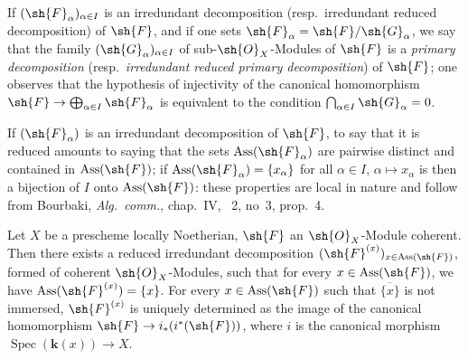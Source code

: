 If $(\sh{F}_\alpha)_{\alpha\in I}$ is an irredundant decomposition (resp.\ irredundant reduced decomposition) of $\sh{F}$, and if one sets $\sh{F}_\alpha=\sh{F}/\sh{G}_\alpha$, we say that the family $(\sh{G}_\alpha)_{\alpha\in I}$ of sub-$\sh{O}_X$-Modules of $\sh{F}$ is a \emph{primary decomposition} (resp.\ \emph{irredundant reduced primary decomposition}) of $\sh{F}$; one observes that the hypothesis of injectivity of the canonical homomorphism $\sh{F}\to\bigoplus_{\alpha\in I}\sh{F}_\alpha$ is equivalent to the condition $\bigcap_{\alpha\in I}\sh{G}_\alpha=0$.


If $(\sh{F}_\alpha)$ is an irredundant decomposition of $\sh{F}$, to say that it is reduced amounts to saying that the sets $\operatorname{Ass}(\sh{F}_\alpha)$ are pairwise distinct and contained in $\operatorname{Ass}(\sh{F})$; if $\operatorname{Ass}(\sh{F}_\alpha)=\{x_\alpha\}$ for all $\alpha\in I$, $\alpha\mapsto x_\alpha$ is then a bijection of $I$ onto $\operatorname{Ass}(\sh{F})$: these properties are local in nature and follow from Bourbaki, \emph{Alg.\ comm.}, chap.~IV, \textsection~2, no~3, prop.~4.

\begin{proposition}[3.2.6]
\label{IV.3.2.6}
Let $X$ be a prescheme locally Noetherian, $\sh{F}$ an $\sh{O}_X$-Module coherent.
Then there exists a reduced irredundant decomposition $(\sh{F}^{(x)})_{x\in\operatorname{Ass}(\sh{F})}$, formed of coherent $\sh{O}_X$-Modules, such that for every $x\in\operatorname{Ass}(\sh{F})$, we have $\operatorname{Ass}(\sh{F}^{(x)})=\{x\}$.
For every $x\in\operatorname{Ass}(\sh{F})$ such that $\overline{\{x\}}$ is not immersed, $\sh{F}^{(x)}$ is uniquely determined as the image of the canonical homomorphism $\sh{F}\to i_*(i^*(\sh{F}))$, where $i$ is the canonical morphism $\operatorname{Spec}(\boldsymbol{k}(x))\to X$.
\end{proposition}

